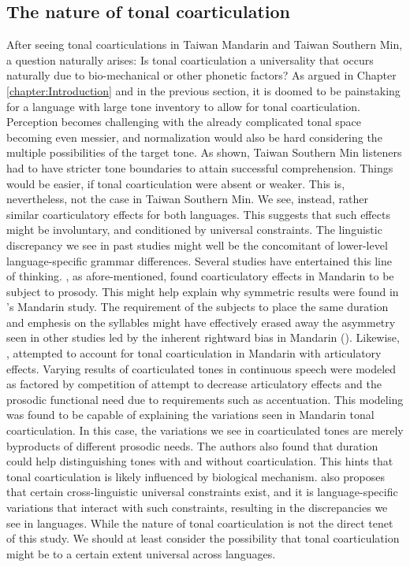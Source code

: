 \documentclass[12pt]{report}
\begin{document}
\begin{CJK}{UTF8}{bsmi}
\section{The nature of tonal coarticulation}
After seeing tonal coarticulations in Taiwan Mandarin and Taiwan Southern Min, a question naturally arises: Is tonal coarticulation a universality that occurs naturally due to bio-mechanical or other phonetic factors? As argued in Chapter \ref{chapter:Introduction} and in the previous section, it is doomed to be painstaking for a language with large tone inventory to allow for tonal coarticulation. Perception becomes challenging with the already complicated tonal space becoming even messier, and normalization would also be hard considering the multiple possibilities of the target tone. As shown, Taiwan Southern Min listeners had to have stricter tone boundaries to attain successful comprehension. Things would be easier, if tonal coarticulation were absent or weaker. This is, nevertheless, not the case in Taiwan Southern Min. We see, instead, rather similar coarticulatory effects for both languages. This suggests that such effects might be involuntary, and conditioned by universal constraints. The linguistic discrepancy we see in past studies might well be the concomitant of lower-level language-specific grammar differences. Several studies have entertained this line of thinking. \cite{ShihSproat1992}, as afore-mentioned, found coarticulatory effects in Mandarin to be subject to prosody. This might help explain why symmetric results were found in \cite{Shen1990}'s Mandarin study. The requirement of the subjects to place the same duration and emphesis on the syllables might have effectively erased away the asymmetry seen in other studies led by the inherent rightward bias in Mandarin (\citealp{Hyman2007}). Likewise, \cite{Haoetal2018}, attempted to account for tonal coarticulation in Mandarin with articulatory effects. Varying results of coarticulated tones in continuous speech were modeled as factored by competition of attempt to decrease articulatory effects and the prosodic functional need due to requirements such as accentuation. This modeling was found to be capable of explaining the variations seen in Mandarin tonal coarticulation. In this case, the variations we see in coarticulated tones are merely byproducts of different prosodic needs. The authors also found that duration could help distinguishing tones with and without coarticulation. This hints that tonal coarticulation is likely influenced by biological mechanism. \cite{Flemming2011} also proposes that certain cross-linguistic universal constraints exist, and it is language-specific variations that interact with such constraints, resulting in the discrepancies we see in languages. While the nature of tonal coarticulation is not the direct tenet of this study. We should at least consider the possibility that tonal coarticulation might be to a certain extent universal across languages.


\end{CJK}
\end{document}

